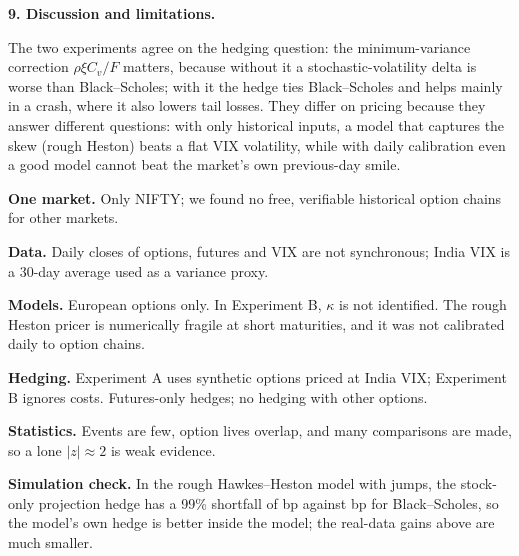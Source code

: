\documentclass[10pt,leqno]{amsart}
\newcommand{\heading}[1]{\medskip\noindent\textbf{#1}\par}
\begin{document}
\begin{table}[ht]
\centering
\caption{Strategy performance in the test period 2019--26 (\% of notional per year; Sharpe without risk-free rate; Max DD and worst day in \% of notional, from daily mark-to-market). The last column is the Sharpe ratio on the training period 2010--18.}\label{tab:strategy}
\small

\end{table}

\FloatBarrier
\heading{9. Discussion and limitations.}
\noindent The two experiments agree on the hedging question: the minimum-variance correction $\rho\xi C_v/F$ matters, because without it a stochastic-volatility delta is worse than Black--Scholes; with it the hedge ties Black--Scholes and helps mainly in a crash, where it also lowers tail losses. They differ on pricing because they answer different questions: with only historical inputs, a model that captures the skew (rough Heston) beats a flat VIX volatility, while with daily calibration even a good model cannot beat the market's own previous-day smile.
\begin{compactitem}
\item \textbf{One market.} Only NIFTY; we found no free, verifiable historical option chains for other markets.
\item \textbf{Data.} Daily closes of options, futures and VIX are not synchronous; India VIX is a 30-day average used as a variance proxy.
\item \textbf{Models.} European options only. In Experiment B, $\kappa$ is not identified. The rough Heston pricer is numerically fragile at short maturities, and it was not calibrated daily to option chains.
\item \textbf{Hedging.} Experiment A uses synthetic options priced at India VIX; Experiment B ignores costs. Futures-only hedges; no hedging with other options.
\item \textbf{Statistics.} Events are few, option lives overlap, and many comparisons are made, so a lone $|z|\approx2$ is weak evidence.
\item \textbf{Simulation check.} In the rough Hawkes--Heston model with jumps, the stock-only projection hedge has a 99\% shortfall of \TSSimGKW{} bp against \TSSimBS{} bp for Black--Scholes, so the model's own hedge is better inside the model; the real-data gains above are much smaller.
\end{compactitem}
\end{document}
